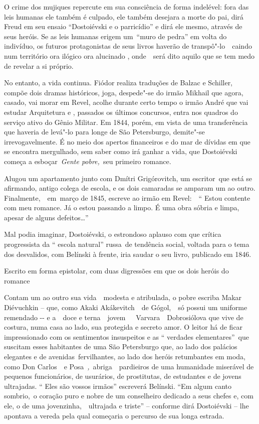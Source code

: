 O crime dos mujiques repercute em sua consciência de forma indelével:
fora das leis humanas ele também é culpado, ele também desejara a morte
do pai, dirá Freud em seu ensaio ``Dostoiévski e o parricídio'' e dirá
ele mesmo, através de seus heróis. Se as leis humanas erigem um~``muro
de pedra'' em volta do indivíduo, os futuros protagonistas de seus
livros haverão de transpô"-lo~~caindo num território ora ilógico ora
alucinado , onde~~será dito aquilo que se tem medo de revelar a si
próprio.

No entanto, a vida continua. Fiódor realiza traduções de Balzac e
Schiller, compõe dois dramas históricos, joga, despede"-se do irmão
Mikhail que agora, casado, vai morar em Revel, acolhe durante certo
tempo o irmão André que vai estudar Arquitetura e , passados os últimos
concursos, entra nos quadros do serviço ativo do Gênio Militar. Em 1844,
porém, em vista de uma transferência que haveria de levá"-lo para longe
de São Petersburgo, demite"-se irrevogavelmente. É no meio dos apertos
financeiros e do mar de dívidas em que se encontra mergulhado, sem saber
como irá ganhar a vida, que Dostoiévski começa a esboçar~\emph{Gente
pobre,~}seu primeiro romance.

Alugou um apartamento junto com Dmítri Grigórovitch, um escritor~que
está se afirmando, antigo colega de escola, e os dois camaradas se
amparam um ao outro. Finalmente,~~em~março de 1845, escreve ao irmão em
Revel:~~`` Estou contente com meu romance. Já o estou passando a limpo.
É uma obra sóbria e limpa, apesar de alguns defeitos\ldots{}''

Mal podia imaginar, Dostoiévski, o estrondoso aplauso com que crítica
progressista da `` escola natural'' russa~de tendência social, voltada
para o tema dos desvalidos, com Belínski à frente, iria saudar o seu
livro, publicado em 1846.

Escrito em forma epistolar, com duas digressões em que os dois heróis do
romance

Contam um ao outro sua vida~~modesta e atribulada, o pobre escriba Makar
Diévuchkin -- que, como Akaki Akákevitch~~de Gógol,~~só possui um
uniforme remendado -\/- e a~~doce e terna~~jovem~~~Varvara~~Dobrosiólova
que vive de costura, numa casa ao lado, sua protegida e secreto amor. O
leitor há de ficar impressionado com os sentimentos insuspeitos e as ``
verdades elementares''~que suscitam esses habitantes de uma São
Petersburgo que, ao lado dos palácios elegantes e de
avenidas~fervilhantes, ao lado dos heróis retumbantes em moda, como Don
Carlos~~e Posa~\emph{,}~abriga~~pardieiros de uma humanidade miserável
de pequenos funcionários, de usurários, de prostitutas, de estudantes e
de jovens ultrajadas. `` Eles são vossos irmãos'' escreverá Belínski.
``Em algum canto sombrio,~o coração puro e nobre de um conselheiro
dedicado a seus chefes e, com ele, o de uma jovenzinha,~~ultrajada e
triste'' -- conforme dirá Dostoiévski -- lhe apontava a vereda pela qual
começaria o percurso de sua longa estrada.

